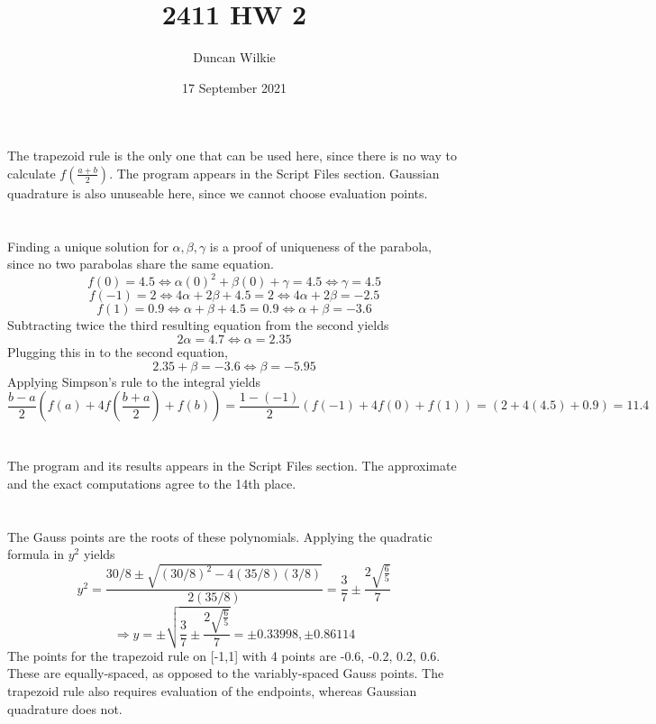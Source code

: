 \documentclass{article}
\title{2411 HW 2}
\author{Duncan Wilkie}
\date{17 September 2021}
\begin{document}
\maketitle

\section{}
The trapezoid rule is the only one that can be used here, since there is no way to calculate $f(\frac{a+b}{2})$.
The program appears in the Script Files section.
Gaussian quadrature is also unuseable here, since we cannot choose evaluation points. 
\section{}
Finding a unique solution for $\alpha, \beta, \gamma$ is a proof of uniqueness of the parabola, since no two parabolas share the same equation.
\[f(0)=4.5\Leftrightarrow \alpha(0)^2+\beta(0)+\gamma = 4.5 \Leftrightarrow \gamma = 4.5\]
\[f(-1)=2\Leftrightarrow 4\alpha+2\beta + 4.5 = 2\Leftrightarrow 4\alpha+2\beta = -2.5\]
\[f(1)=0.9\Leftrightarrow \alpha+\beta + 4.5 = 0.9 \Leftrightarrow \alpha+\beta=-3.6\]
Subtracting twice the third resulting equation from the second yields
\[2\alpha = 4.7 \Leftrightarrow \alpha = 2.35\]
Plugging this in to the second equation,
\[2.35+\beta = -3.6\Leftrightarrow \beta = -5.95\]
Applying Simpson's rule to the integral yields
\[\frac{b-a}{2}\left(f(a)+4f\left(\frac{b+a}{2}\right)+f(b)\right)=\frac{1-(-1)}{2}\left(f(-1)+4f(0)+f(1)\right)=\left(2+4(4.5)+0.9\right)=11.4\]
\section{}
The program and its results appears in the Script Files section. The approximate and the exact computations agree to the 14th place.
\section{}
The Gauss points are the roots of these polynomials. Applying the quadratic formula in $y^2$ yields
\[y^2=\frac{30/8\pm\sqrt{(30/8)^2-4(35/8)(3/8)}}{2(35/8)}=\frac{3}{7}\pm\frac{2\sqrt{\frac{6}{5}}}{7}\]
\[\Rightarrow y = \pm\sqrt{\frac{3}{7}\pm\frac{2\sqrt{\frac{6}{5}}}{7}}=\pm0.33998, \pm0.86114\]
The points for the trapezoid rule on [-1,1] with 4 points are -0.6, -0.2, 0.2, 0.6. These are equally-spaced, as opposed to the variably-spaced Gauss points.
The trapezoid rule also requires evaluation of the endpoints, whereas Gaussian quadrature does not.
\end{document}
